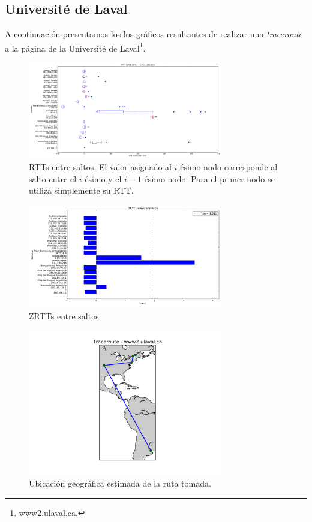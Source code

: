\subsection{Université de Laval}

A continuación presentamos los los gráficos resultantes de realizar una \textit{traceroute} a la página de la Université de Laval\footnote{www2.ulaval.ca.}.

\begin{figure}[H]
    \centering
    \includegraphics[width=8.5cm]{img/grafico1-www2-ulaval-ca.pdf}
    \caption{RTTs entre saltos. El valor asignado al $i$-ésimo nodo corresponde al salto entre el $i$-ésimo y el $i - 1$-ésimo nodo. Para el primer nodo se utiliza simplemente su RTT.}
\end{figure}

\begin{figure}[H]
    \centering
    \includegraphics[width=8.5cm]{img/grafico2-www2-ulaval-ca.pdf}
    \caption{ZRTTs entre saltos.}
\end{figure}

\begin{figure}[H]
    \centering
    \includegraphics[width=8.5cm]{img/grafico3-www2-ulaval-ca.pdf}
    \caption{Ubicación geográfica estimada de la ruta tomada.}
\end{figure}

